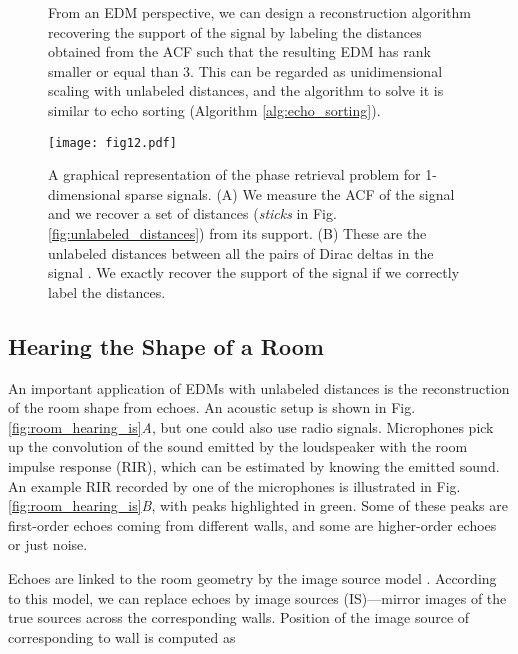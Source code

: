 \documentclass[10pt,double]{IEEEtran}
\begin{document}
\begin{figure*}[t]
\begin{spmagbox}
\begin{multicols}{2}
From an EDM perspective, we can design a reconstruction algorithm recovering
the support of the signal  by labeling the distances obtained from the
ACF such that the resulting EDM has rank smaller or equal than 3. This can be
regarded as unidimensional scaling with unlabeled distances, and the algorithm
to solve it is similar to echo sorting (Algorithm \ref{alg:echo_sorting}).


\vspace{5mm}

\texttt{[image: fig12.pdf]}

\caption{\selectfont A graphical representation of the phase retrieval problem for
1-dimensional sparse signals. (A) We measure the ACF of the signal and we
recover a set of distances (\emph{sticks} in Fig.
\ref{fig:unlabeled_distances}) from its support. (B) These are the unlabeled
distances between all the pairs of Dirac deltas in the signal . We
exactly recover the support of the signal if we correctly label the distances.}

\end{multicols}
\end{spmagbox}
\end{figure*}

\subsection{Hearing the Shape of a Room } \label{sub:hearing_the_shape_of_a_room}

An important application of EDMs with unlabeled distances is the
reconstruction of the room shape from echoes. An acoustic setup is shown in
Fig. \ref{fig:room_hearing_is}\textsl{A}, but one could also use radio
signals. Microphones pick up the convolution of the sound emitted by the
loudspeaker with the room impulse response (RIR), which can be estimated by
knowing the emitted sound. An example RIR recorded by one of the microphones
is illustrated in Fig.
\ref{fig:room_hearing_is}\textsl{B}, with peaks highlighted in green.
Some of these peaks are first-order echoes coming from different walls, and
some are higher-order echoes or just noise.

Echoes are linked to the room geometry by the image source model
\cite{Allen:1979ua}. According to this model, we can replace echoes by image
sources (IS)---mirror images of the true sources across the corresponding walls.
Position of the image source of  corresponding to wall  is computed as
\end{document}
